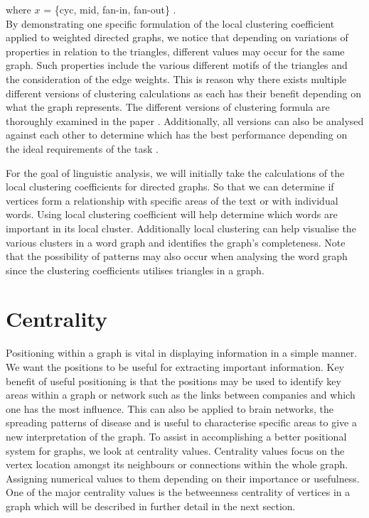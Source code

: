 where $x$ = \{cyc, mid, fan-in, fan-out\} .\\

By demonstrating one specific formulation of the local clustering coefficient applied to weighted directed graphs, we notice that depending on variations of properties in relation to the triangles, different values may occur for the same graph. Such properties include the various different motifs of the triangles and the consideration of the edge weights. This is reason why there exists multiple different versions of clustering calculations as each has their benefit depending on what the graph represents. The different versions of clustering formula are thoroughly examined in the paper \cite{PhysRevResearch.3.043124}. Additionally, all versions can also be analysed against each other to determine which has the best performance depending on the ideal requirements of the task \cite{CLEMENTE201826}.

For the goal of linguistic analysis, we will initially take the calculations of the local clustering coefficients for directed graphs. So that we can determine if vertices form a relationship with specific areas of the text or with individual words. Using local clustering coefficient will help determine which words are important in its local cluster. Additionally local clustering can help visualise the various clusters in a word graph and identifies the graph's completeness. Note that the possibility of patterns may also occur when analysing the word graph since the clustering coefficients utilises triangles in a graph. 

\section{Centrality}
Positioning within a graph is vital in displaying information in a simple manner. We want the positions to be useful for extracting important information. Key benefit of useful positioning is that the positions may be used to identify key areas within a graph or network such as the links between companies and which one has the most influence. This can also be applied to brain networks, the spreading patterns of disease and is useful to characterise specific areas to give a new interpretation of the graph. To assist in accomplishing a better positional system for graphs, we look at centrality values. Centrality values focus on the vertex location amongst its neighbours or connections within the whole graph. Assigning numerical values to them depending on their importance or usefulness. One of the major centrality values is the betweenness centrality of vertices in a graph which will be described in further detail in the next section.

